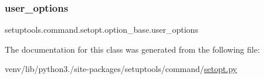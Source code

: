 \subsubsection{\texorpdfstring{user\+\_\+options}{user\_options}}
{\footnotesize\ttfamily setuptools.\+command.\+setopt.\+option\+\_\+base.\+user\+\_\+options\hspace{0.3cm}{\ttfamily [static]}}



The documentation for this class was generated from the following file\+:\begin{DoxyCompactItemize}
\item 
venv/lib/python3./site-\/packages/setuptools/command/\hyperlink{setopt_8py}{setopt.\+py}\end{DoxyCompactItemize}
